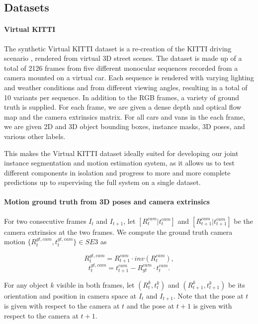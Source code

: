 \subsection{Datasets}

\paragraph{Virtual KITTI}
The synthetic Virtual KITTI dataset \cite{VKITTI} is a re-creation of the KITTI
driving scenario \cite{KITTI2012, KITTI2015}, rendered from virtual 3D street
scenes.
The dataset is made up of a total of 2126 frames from five different monocular
sequences recorded from a camera mounted on a virtual car.
Each sequence is rendered with varying lighting and weather conditions and
from different viewing angles, resulting in a total of 10 variants per sequence.
In addition to the RGB frames, a variety of ground truth is supplied.
For each frame, we are given a dense depth and optical flow map and the camera
extrinsics matrix.
For all cars and vans in the each frame, we are given 2D and 3D object bounding
boxes, instance masks, 3D poses, and various other labels.

This makes the Virtual KITTI dataset ideally suited for developing our joint
instance segmentation and motion estimation system, as it allows us to test
different components in isolation and progress to more and more complete
predictions up to supervising the full system on a single dataset.

\paragraph{Motion ground truth from 3D poses and camera extrinsics}
For two consecutive frames $I_t$ and $I_{t+1}$,
let $[R_t^{cam}|t_t^{cam}]$
and $[R_{t+1}^{cam}|t_{t+1}^{cam}]$
be the camera extrinsics at the two frames.
We compute the ground truth camera motion
$\{R_t^{gt, cam}, t_t^{gt, cam}\} \in SE3$ as

\begin{equation}
R_{t}^{gt, cam} = R_{t+1}^{cam}  \cdot inv(R_t^{cam}),
\end{equation}
\begin{equation}
t_{t}^{gt, cam} = t_{t+1}^{cam}  - R_{gt}^{cam} \cdot t_t^{cam}.
\end{equation}

For any object $k$ visible in both frames, let
$(R_t^k, t_t^k)$ and $(R_{t+1}^k, t_{t+1}^k)$
be its orientation and position in camera space
at $I_t$ and $I_{t+1}$.
Note that the pose at $t$ is given with respect to the camera at $t$ and
the pose at $t+1$ is given with respect to the camera at $t+1$.

